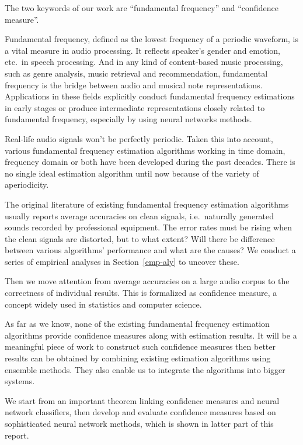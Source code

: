 \documentclass[11pt,a4paper,titlepage]{article}
\begin{document}
The two keywords of our work are \enquote{fundamental frequency} and \enquote{confidence measure}.

\bigskip

Fundamental frequency, defined as the lowest frequency of a periodic waveform, is a vital measure in audio processing.
It reflects speaker's gender and emotion, etc.\ in speech processing.
And in any kind of content-based music processing, such as genre analysis, music retrieval and recommendation, fundamental frequency is the bridge between audio and musical note representations.
Applications in these fields explicitly conduct fundamental frequency estimations in early stages or produce intermediate representations closely related to fundamental frequency, especially by using neural networks methods.

Real-life audio signals won't be perfectly periodic.
Taken this into account, various fundamental frequency estimation algorithms working in time domain, frequency domain or both have been developed during the past decades.
There is no single ideal estimation algorithm until now because of the variety of aperiodicity.

The original literature of existing fundamental frequency estimation algorithms usually reports average accuracies on clean signals, i.e.\ naturally generated sounds recorded by professional equipment.
The error rates must be rising when the clean signals are distorted, but to what extent? Will there be difference between various algorithms' performance and what are the causes? We conduct a series of empirical analyses in Section~\ref{emp-aly} to uncover these.

\bigskip

Then we move attention from average accuracies on a large audio corpus to the correctness of individual results.
This is formalized as confidence measure, a concept widely used in statistics and computer science.

As far as we know, none of the existing fundamental frequency estimation algorithms provide confidence measures along with estimation results.
It will be a meaningful piece of work to construct such confidence measures then better results can be obtained by combining existing estimation algorithms using ensemble methods.
They also enable us to integrate the algorithms into bigger systems.

We start from an important theorem linking confidence measures and neural network classifiers, then develop and evaluate confidence measures based on sophisticated neural network methods, which is shown in latter part of this report.
\end{document}
